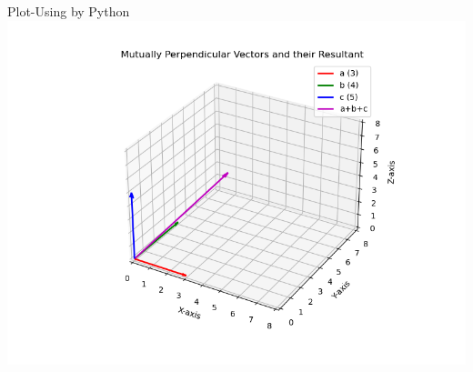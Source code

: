 \documentclass{beamer}
\begin{document}
\begin{frame}{Plot-Using by Python}
    \centering
    \includegraphics[width=\columnwidth, height=0.8\textheight, keepaspectratio]{fig4.png}     
\end{frame}
\end{document}
